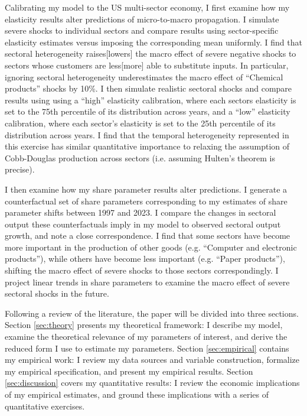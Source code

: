 \documentclass[11pt]{article}
\begin{document}
Calibrating my model to the US multi-sector economy, I first examine how my elasticity results alter predictions of micro-to-macro propagation. I simulate severe shocks to individual sectors and compare results using sector-specific elasticity estimates versus imposing the corresponding mean uniformly. I find that sectoral heterogeneity raises[lowers] the macro effect of severe negative shocks to sectors whose customers are less[more] able to substitute inputs. In particular, ignoring sectoral heterogeneity underestimates the macro effect of ``Chemical products'' shocks by 10\%. I then simulate realistic sectoral shocks and compare results using using a “high” elasticity calibration, where each sectors elasticity is set to the 75th percentile of its distribution across years, and a “low” elasticity calibration, where each sector's elasticity is set to the 25th percentile of its distribution across years. I find that the temporal heterogeneity represented in this exercise has similar quantitative importance to relaxing the assumption of Cobb-Douglas production across sectors (i.e. assuming Hulten's theorem is precise).

I then examine how my share parameter results alter predictions. I generate a counterfactual set of share parameters corresponding to my estimates of share parameter shifts between 1997 and 2023. I compare the changes in sectoral output these counterfactuals imply in my model to observed sectoral output growth, and note a close correspondence. I find that some sectors have become more important in the production of other goods (e.g. ``Computer and electronic products''), while others have become less important (e.g. ``Paper products''), shifting the macro effect of severe shocks to those sectors correspondingly. I project linear trends in share parameters to examine the macro effect of severe sectoral shocks in the future.

Following a review of the literature, the paper will be divided into three sections. Section \ref{sec:theory} presents my theoretical framework: I describe my model, examine the theoretical relevance of my parameters of interest, and derive the reduced form I use to estimate my parameters. Section \ref{sec:empirical} contains my empirical work: I review my data sources and variable construction, formalize my empirical specification, and present my empirical results. Section \ref{sec:discussion} covers my quantitative results: I review the economic implications of my empirical estimates, and ground these implications with a series of quantitative exercises.
\end{document}
